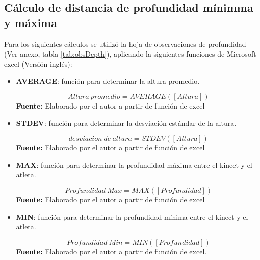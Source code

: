 \subsection{C\'alculo de distancia de profundidad m\'inimma y m\'axima} \label{dis:deep}
Para los siguientes c\'alculos se utiliz\'o la hoja de observaciones de profundidad (Ver anexo, tabla  \ref{tab:obsDepth}), aplicando la siguientes funciones de Microsoft excel (Versi\'on ingl\'es):
\begin{itemize}
       \item \textbf{AVERAGE}: funci\'on para determinar la altura promedio.
\begin{formula}[H]
	\centering
	\caption{c\'alculo de altura promedio}
	\label{frm:avgHeight}
	\begin{equation}
	Altura \: promedio =AVERAGE([Altura])
	\end{equation}
		\textbf{Fuente:} Elaborado por el autor a partir de funci\'on de excel
\end{formula}
       \item \textbf{STDEV}: funci\'on para determinar la desviaci\'on est\'andar de la altura.
\begin{formula}[H]
	\centering
	\caption{c\'alculo de desviaci\'on est\'andar de la altura}
	\label{frm:stdevHeight}
	\begin{equation}
	desviacion \:  de \: altura =STDEV([Altura])
	\end{equation}
		\textbf{Fuente:} Elaborado por el autor a partir de funci\'on de excel
\end{formula}
       \item \textbf{MAX}: funci\'on para determinar la profundidad m\'axima entre el kinect y el atleta.
       \begin{formula}[H]
	\centering
	\caption{c\'alculo de la profundidad m\'axima}
	\label{frm:maxDepth}
	\begin{equation}
	Profundidad \: Max =MAX([Profundidad])
	\end{equation}
		\textbf{Fuente:} Elaborado por el autor a partir de funci\'on de excel
\end{formula}
       \item \textbf{MIN}: funci\'on para determinar la profundidad m\'inima entre el kinect y el atleta.
              \begin{formula}[H]
	\centering
	\caption{c\'alculo de la profundidad m\'inima}
	\label{frm:minDepth}
	\begin{equation}
	Profundidad \:  Min =MIN([Profundidad])
	\end{equation}
		\textbf{Fuente:} Elaborado por el autor a partir de funci\'on de excel.
\end{formula}
\end{itemize}
